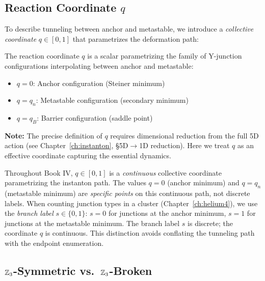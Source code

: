 \subsection{Reaction Coordinate $q$}

To describe tunneling between anchor and metastable, we introduce a \emph{collective
coordinate} $q \in [0, 1]$ that parametrizes the deformation path:

\begin{derivationbox}[title=Definition: Reaction Coordinate]
    The reaction coordinate $q$ is a scalar parametrizing the family of
    Y-junction configurations interpolating between anchor and metastable:
    \begin{itemize}
        \item $q = 0$: Anchor configuration (Steiner minimum)
        \item $q = q_n$: Metastable configuration (secondary minimum)
        \item $q = q_B$: Barrier configuration (saddle point)
    \end{itemize}
    \tagDc
\end{derivationbox}

\textbf{Note:} The precise definition of $q$ requires dimensional reduction
from the full 5D action (see Chapter~\ref{ch:instanton}, \S5D$\to$1D reduction).
Here we treat $q$ as an effective coordinate capturing the essential dynamics.

\begin{tcolorbox}[colback=gray!5,colframe=gray!50!black,title=Consistency Note: Continuous $q$ vs.\ Discrete Minima]
Throughout Book IV, $q \in [0, 1]$ is a \emph{continuous} collective coordinate
parametrizing the instanton path. The values $q = 0$ (anchor minimum) and
$q = q_n$ (metastable minimum) are \emph{specific points} on this continuous path,
not discrete labels. When counting junction types in a cluster
(Chapter~\ref{ch:helium4}), we use the \emph{branch label} $s \in \{0, 1\}$:
$s = 0$ for junctions at the anchor minimum, $s = 1$ for junctions at the
metastable minimum. The branch label $s$ is discrete; the coordinate $q$ is
continuous. This distinction avoids conflating the tunneling path with the
endpoint enumeration.
\end{tcolorbox}

\subsection{$\mathbb{Z}_3$-Symmetric vs.\ $\mathbb{Z}_3$-Broken}

